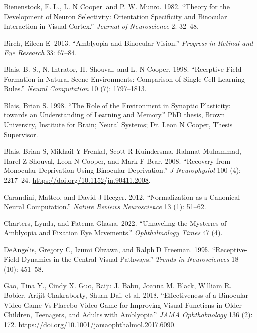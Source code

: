 \documentclass[
  sn-apa,
  pdflatex]{sn-jnl}
\theoremstyle{thmstyleone}%
\theoremstyle{thmstyletwo}%
\theoremstyle{thmstylethree}%
\newenvironment{CSLReferences}%
  {}%
  {\par}
\begin{document}
\hypertarget{refs}{}
\begin{CSLReferences}{1}{0}
\leavevmode{}%
Bienenstock, E. L., L. N Cooper, and P. W. Munro. 1982. {``Theory for
the Development of Neuron Selectivity: Orientation Specificity and
Binocular Interaction in Visual Cortex.''} \emph{Journal of
Neuroscience} 2: 32--48.

\leavevmode{}%
Birch, Eileen E. 2013. {``Amblyopia and Binocular Vision.''}
\emph{Progress in Retinal and Eye Research} 33: 67--84.

\leavevmode{}%
Blais, B. S., N. Intrator, H. Shouval, and L. N Cooper. 1998.
{``Receptive Field Formation in Natural Scene Environments: Comparison
of Single Cell Learning Rules.''} \emph{Neural Computation} 10 (7):
1797--1813.

\leavevmode{}%
Blais, Brian S. 1998. {``The Role of the Environment in Synaptic
Plasticity:\\
towards an Understanding of Learning and Memory.''} PhD thesis, Brown
University, Institute for Brain; Neural Systems; Dr. Leon N Cooper,
Thesis Supervisor.

\leavevmode{}%
Blais, Brian S, Mikhail Y Frenkel, Scott R Kuindersma, Rahmat Muhammad,
Harel Z Shouval, Leon N Cooper, and Mark F Bear. 2008. {``Recovery from
Monocular Deprivation Using Binocular Deprivation.''} \emph{J
Neurophysiol} 100 (4): 2217--24.
\url{https://doi.org/10.1152/jn.90411.2008}.

\leavevmode{}%
Carandini, Matteo, and David J Heeger. 2012. {``Normalization as a
Canonical Neural Computation.''} \emph{Nature Reviews Neuroscience} 13
(1): 51--62.

\leavevmode{}%
Charters, Lynda, and Fatema Ghasia. 2022. {``Unraveling the Mysteries of
Amblyopia and Fixation Eye Movements.''} \emph{Ophthalmology Times} 47
(4).

\leavevmode{}%
DeAngelis, Gregory C, Izumi Ohzawa, and Ralph D Freeman. 1995.
{``Receptive-Field Dynamics in the Central Visual Pathways.''}
\emph{Trends in Neurosciences} 18 (10): 451--58.

\leavevmode{}%
Gao, Tina Y., Cindy X. Guo, Raiju J. Babu, Joanna M. Black, William R.
Bobier, Arijit Chakraborty, Shuan Dai, et al. 2018. {``Effectiveness of
a Binocular Video Game Vs Placebo Video Game for Improving Visual
Functions in Older Children, Teenagers, and Adults with Amblyopia.''}
\emph{JAMA Ophthalmology} 136 (2): 172.
\url{https://doi.org/10.1001/jamaophthalmol.2017.6090}.


\end{CSLReferences}
\end{document}
